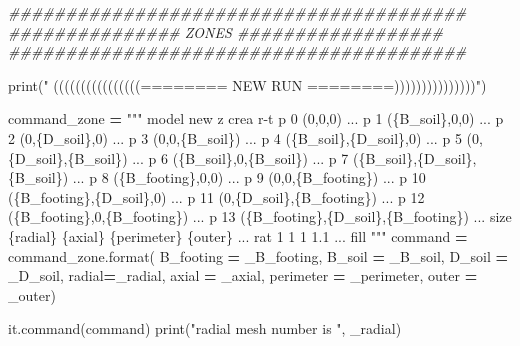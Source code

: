 \documentclass[a4paper, nobind]{templates/ociamthesis}
\newenvironment{Shaded}{\begin{snugshade}}{\end{snugshade}}
\newcommand{\BuiltInTok}[1]{#1}
\newcommand{\CommentTok}[1]{\textcolor[rgb]{0.56,0.35,0.01}{\textit{#1}}}
\newcommand{\NormalTok}[1]{#1}
\newcommand{\OperatorTok}[1]{\textcolor[rgb]{0.81,0.36,0.00}{\textbf{#1}}}
\newcommand{\SpecialCharTok}[1]{\textcolor[rgb]{0.00,0.00,0.00}{#1}}
\newcommand{\StringTok}[1]{\textcolor[rgb]{0.31,0.60,0.02}{#1}}
\renewenvironment{Shaded}
{
  \vspace{10pt}%
  \begin{snugshade}%
}{%
  \end{snugshade}%
  \vspace{8pt}%
}
\begin{document}
\begin{Shaded}
\begin{Highlighting}[]
\CommentTok{\#\#\#\#\#\#\#\#\#\#\#\#\#\#\#\#\#\#\#\#\#\#\#\#\#\#\#\#\#\#\#\#\#\#\#\#\#\#\#\#}
\CommentTok{\#\#\#\#\#\#\#\#\#\#\#\#\#\#\# ZONES \#\#\#\#\#\#\#\#\#\#\#\#\#\#\#\#\#\#}
\CommentTok{\#\#\#\#\#\#\#\#\#\#\#\#\#\#\#\#\#\#\#\#\#\#\#\#\#\#\#\#\#\#\#\#\#\#\#\#\#\#\#\#}

\BuiltInTok{print}\NormalTok{(}\StringTok{"               ((((((((((((((((======== NEW RUN ========)))))))))))))))"}\NormalTok{)}

\NormalTok{command\_zone }\OperatorTok{=} \StringTok{"""}
\StringTok{model new}
\StringTok{z crea r{-}t p 0 (0,0,0) ...}
\StringTok{           p 1 (}\SpecialCharTok{\{B\_soil\}}\StringTok{,0,0) ...}
\StringTok{           p 2 (0,}\SpecialCharTok{\{D\_soil\}}\StringTok{,0) ...}
\StringTok{           p 3 (0,0,}\SpecialCharTok{\{B\_soil\}}\StringTok{) ...}
\StringTok{           p 4 (}\SpecialCharTok{\{B\_soil\}}\StringTok{,}\SpecialCharTok{\{D\_soil\}}\StringTok{,0) ...}
\StringTok{           p 5 (0,}\SpecialCharTok{\{D\_soil\}}\StringTok{,}\SpecialCharTok{\{B\_soil\}}\StringTok{) ...}
\StringTok{           p 6 (}\SpecialCharTok{\{B\_soil\}}\StringTok{,0,}\SpecialCharTok{\{B\_soil\}}\StringTok{) ...}
\StringTok{           p 7 (}\SpecialCharTok{\{B\_soil\}}\StringTok{,}\SpecialCharTok{\{D\_soil\}}\StringTok{,}\SpecialCharTok{\{B\_soil\}}\StringTok{) ...}
\StringTok{           p 8 (}\SpecialCharTok{\{B\_footing\}}\StringTok{,0,0) ...}
\StringTok{           p 9 (0,0,}\SpecialCharTok{\{B\_footing\}}\StringTok{) ...}
\StringTok{           p 10 (}\SpecialCharTok{\{B\_footing\}}\StringTok{,}\SpecialCharTok{\{D\_soil\}}\StringTok{,0) ...}
\StringTok{           p 11 (0,}\SpecialCharTok{\{D\_soil\}}\StringTok{,}\SpecialCharTok{\{B\_footing\}}\StringTok{) ...}
\StringTok{           p 12 (}\SpecialCharTok{\{B\_footing\}}\StringTok{,0,}\SpecialCharTok{\{B\_footing\}}\StringTok{) ...}
\StringTok{           p 13 (}\SpecialCharTok{\{B\_footing\}}\StringTok{,}\SpecialCharTok{\{D\_soil\}}\StringTok{,}\SpecialCharTok{\{B\_footing\}}\StringTok{) ...}
\StringTok{           size }\SpecialCharTok{\{radial\}}\StringTok{ }\SpecialCharTok{\{axial\}}\StringTok{ }\SpecialCharTok{\{perimeter\}}\StringTok{ }\SpecialCharTok{\{outer\}}\StringTok{ ...}
\StringTok{           rat 1 1 1 1.1 ...}
\StringTok{           fill}
\StringTok{"""}
\NormalTok{command }\OperatorTok{=}\NormalTok{ command\_zone.}\BuiltInTok{format}\NormalTok{(}
\NormalTok{B\_footing }\OperatorTok{=}\NormalTok{ \_B\_footing,}
\NormalTok{B\_soil }\OperatorTok{=}\NormalTok{ \_B\_soil,}
\NormalTok{D\_soil }\OperatorTok{=}\NormalTok{ \_D\_soil,}
\NormalTok{radial}\OperatorTok{=}\NormalTok{\_radial,}
\NormalTok{axial }\OperatorTok{=}\NormalTok{ \_axial,}
\NormalTok{perimeter }\OperatorTok{=}\NormalTok{ \_perimeter,}
\NormalTok{outer }\OperatorTok{=}\NormalTok{ \_outer)}

\NormalTok{it.command(command)}
\BuiltInTok{print}\NormalTok{(}\StringTok{"radial mesh number is "}\NormalTok{, \_radial)}
\end{Highlighting}
\end{Shaded}
\end{document}
